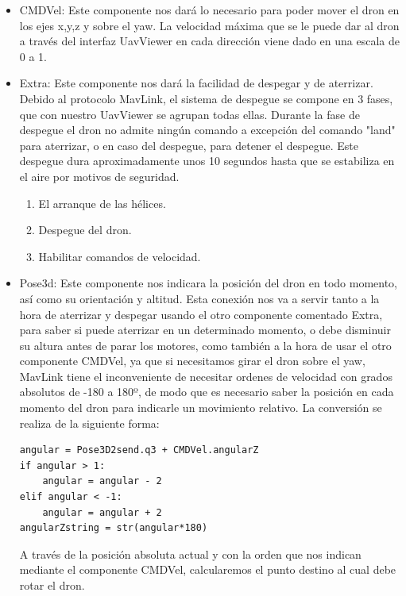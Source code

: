 \begin{itemize}
\item CMDVel: Este componente nos dará lo necesario para poder mover el dron en los ejes x,y,z y sobre el yaw. La velocidad máxima que se le puede dar al dron a través del interfaz UavViewer en cada dirección viene dado en una escala de 0 a 1.  
\item Extra: Este componente nos dará la facilidad de despegar y de aterrizar. Debido al protocolo MavLink, el sistema de despegue se compone en 3 fases, que con nuestro UavViewer se agrupan todas ellas. Durante la fase de despegue el dron no admite ningún comando a excepción del comando "land" para aterrizar, o en caso del despegue, para detener el despegue.  Este despegue dura aproximadamente unos 10 segundos hasta que se estabiliza en el aire por motivos de seguridad. \begin{enumerate}
						\item El arranque de las hélices. 
                        \item Despegue del dron.
                        \item Habilitar comandos de velocidad.
						\end{enumerate}
\item Pose3d: Este componente nos indicara la posición del dron en todo momento, así como su orientación y altitud. Esta conexión nos va a servir tanto a la hora de aterrizar y despegar usando el otro componente comentado Extra, para saber si puede aterrizar en un determinado momento, o debe disminuir su altura antes de parar los motores, como también a la hora de usar el otro componente CMDVel, ya que si necesitamos girar el dron sobre el yaw, MavLink tiene el inconveniente de necesitar ordenes de velocidad con grados absolutos de -180 a 180º, de modo que es necesario saber la posición en cada momento del dron para indicarle un movimiento relativo. La conversión se realiza de la siguiente forma:

{\scriptsize
\begin{verbatim}
angular = Pose3D2send.q3 + CMDVel.angularZ
if angular > 1:
	angular = angular - 2
elif angular < -1:
	angular = angular + 2
angularZstring = str(angular*180)
\end{verbatim}}

A través de la posición absoluta actual y con la orden que nos indican mediante el componente CMDVel, calcularemos el punto destino al cual debe rotar el dron. 

\end{itemize}

